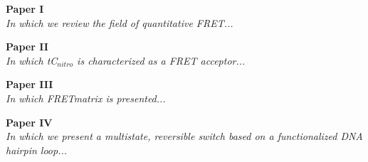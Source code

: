 \cleardoublepage
\begin{titlepage}
    \vspace*{\fill}
    \begin{center}
      {\LARGE \textbf{Paper I}}\\[0.5cm]
      {\Large \textit{In which we review the field of quantitative FRET...}}\\[0.4cm]
    \end{center}
    \vspace*{\fill}
  \end{titlepage}
\cleardoublepage


\cleardoublepage
\begin{titlepage}
    \vspace*{\fill}
    \begin{center}
      {\LARGE \textbf{Paper II}}\\[0.5cm]
      {\Large \textit{In which tC$_{nitro}$ is characterized as a FRET acceptor...}}\\[0.4cm]
    \end{center}
    \vspace*{\fill}
  \end{titlepage}
\cleardoublepage


\cleardoublepage
\begin{titlepage}
    \vspace*{\fill}
    \begin{center}
      {\LARGE \textbf{Paper III}}\\[0.5cm]
      {\Large \textit{In which FRETmatrix is presented...}}\\[0.4cm]
    \end{center}
    \vspace*{\fill}
  \end{titlepage}
\cleardoublepage



\cleardoublepage
\begin{titlepage}
    \vspace*{\fill}
    \begin{center}
      {\LARGE \textbf{Paper IV}}\\[0.5cm]
      {\Large \textit{In which we present a multistate, reversible switch based on a functionalized DNA hairpin loop...}}\\[0.4cm]
    \end{center}
    \vspace*{\fill}
  \end{titlepage}
\cleardoublepage



